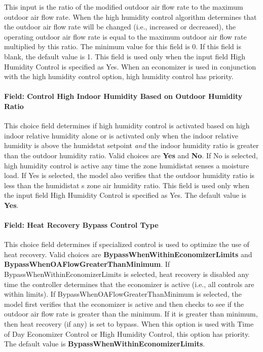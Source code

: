 This input is the ratio of the modified outdoor air flow rate to the maximum outdoor air flow rate. When the high humidity control algorithm determines that the outdoor air flow rate will be changed (i.e., increased or decreased), the operating outdoor air flow rate is equal to the maximum outdoor air flow rate multiplied by this ratio. The minimum value for this field is 0. If this field is blank, the default value is 1. This field is used only when the input field High Humidity Control is specified as Yes. When an economizer is used in conjunction with the high humidity control option, high humidity control has priority.

\paragraph{Field: Control High Indoor Humidity Based on Outdoor Humidity Ratio}\label{field-control-high-indoor-humidity-based-on-outdoor-humidity-ratio}

This choice field determines if high humidity control is activated based on high indoor relative humidity alone or is activated only when the indoor relative humidity is above the humidstat setpoint \emph{and} the indoor humidity ratio is greater than the outdoor humidity ratio. Valid choices are \textbf{Yes} and \textbf{No}. If No is selected, high humidity control is active any time the zone humidistat senses a moisture load. If Yes is selected, the model also verifies that the outdoor humidity ratio is less than the humidistat s zone air humidity ratio. This field is used only when the input field High Humidity Control is specified as Yes. The default value is \textbf{Yes}.

\paragraph{Field: Heat Recovery Bypass Control Type}\label{field-heat-recovery-bypass-control-type}

This choice field determines if specialized control is used to optimize the use of heat recovery. Valid choices are \textbf{BypassWhenWithinEconomizerLimits} and \textbf{BypassWhenOAFlowGreaterThanMinimum}. If BypassWhenWithinEconomizerLimits is selected, heat recovery is disabled any time the controller determines that the economizer is active (i.e., all controls are within limits). If BypassWhenOAFlowGreaterThanMinimum is selected, the model first verifies that the economizer is active and then checks to see if the outdoor air flow rate is greater than the minimum. If it is greater than minimum, then heat recovery (if any) is set to bypass. When this option is used with Time of Day Economizer Control or High Humidity Control, this option has priority. The default value is \textbf{BypassWhenWithinEconomizerLimits}.


